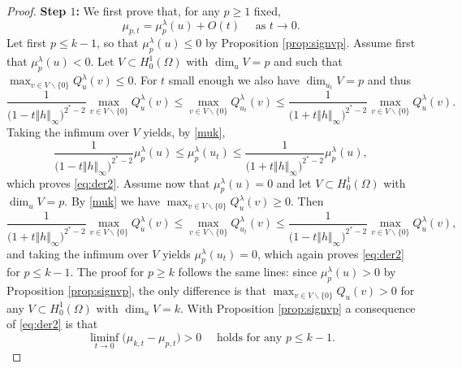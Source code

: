 \documentclass[10pt]{amsart}
\numberwithin{equation}{section}
\newcommand{\Om}{\Omega}
\newcommand{\mpl}{\mu_{p}^{\lambda}}
\theoremstyle{plain}
\theoremstyle{remark}
\begin{document}
\begin{proof}
\textbf{Step $1$:} We first prove that, for any $p \ge 1$ fixed,
\begin{equation} \label{eq:der2}
\mu_{p,t} = \mu_{p}^{\lambda}(u) + O(t) \quad \text{ as } t \to 0. 
\end{equation}
Let first $p \le  k-1$, so that  $\mu_{p}^{\lambda}(u) \le 0$ by Proposition \ref{prop:signvp}. Assume first that $\mpl(u)<0$. Let $V \subset H^1_0(\Om)$ with $\dim_u V= p$ and such that $ \max_{v \in V \backslash \{0\}} Q_u^{\lambda}(v) \le0$. For $t$ small enough we also have $\dim_{u_t} V = p$ and thus 
$$ \frac{1}{\big(1 - t \Vert h \Vert_{\infty}\big)^{2^*-2}}  \max_{v \in V \backslash \{0\}} Q_u^{\lambda}(v) \le  \max_{v \in V \backslash \{0\}} Q_{u_t}^{\lambda}(v) \le \frac{1}{\big(1 + t \Vert h \Vert_{\infty}\big)^{2^*-2}}  \max_{v \in V \backslash \{0\}} Q_u^{\lambda}(v). $$
Taking the infimum over $V$ yields, by \eqref{muk},
$$  \frac{1}{\big(1 - t \Vert h \Vert_{\infty}\big)^{2^*-2}}  \mu_{p}^{\lambda}(u) \le \mu_{p}^{\lambda}(u_t) \le  \frac{1}{\big(1 + t \Vert h \Vert_{\infty}\big)^{2^*-2}}    \mu_{p}^{\lambda}(u),$$
which proves \eqref{eq:der2}. Assume now that $\mpl(u) = 0$ and let $V \subset H^1_0(\Om)$ with $\dim_u V= p$. By \eqref{muk} we have $ \max_{v \in V \backslash \{0\}} Q_u^{\lambda}(v) \ge 0$. Then
$$ \frac{1}{\big(1 + t \Vert h \Vert_{\infty}\big)^{2^*-2}}  \max_{v \in V \backslash \{0\}} Q_u^{\lambda}(v) \le  \max_{v \in V \backslash \{0\}} Q_{u_t}^{\lambda}(v) \le \frac{1}{\big(1 - t \Vert h \Vert_{\infty}\big)^{2^*-2}}  \max_{v \in V \backslash \{0\}} Q_u^{\lambda}(v), $$
and taking the infimum over $V$ yields $\mpl(u_t) =0$, which again proves \eqref{eq:der2} for $p \le k-1$. The proof for $p \ge k$ follows the same lines: since $\mpl(u) >0$ by Proposition \ref{prop:signvp}, the only difference is that $ \max_{v \in V \backslash \{0\}} Q_u(v) >0$ for any $V \subset H^1_0(\Om)$ with $\dim_u V= k$. With Proposition \ref{prop:signvp} a consequence of \eqref{eq:der2} is that
\begin{equation} \label{eq:der1}
\liminf_{t \to 0} \big( \mu_{k,t} - \mu_{p,t} \big) >0 \quad \text{ holds for any } p \le k-1.
\end{equation}

\medskip


\end{proof}
\end{document}
